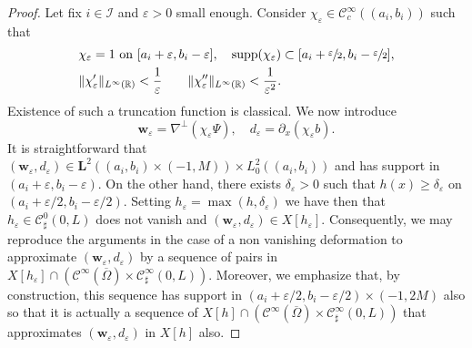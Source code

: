 \documentclass[10pt]{amsart}
\let\mathcal\mathscr
\theoremstyle{remark}
\theoremstyle{definition}
\newcommand{\wg}{\boldsymbol{w}}
\newcommand{\BS}[1]{\boldsymbol{#1}}
\begin{document}
\begin{proof}
Let fix $i \in \mathcal I$ and $\varepsilon>0$ small enough. Consider $\chi_{\varepsilon} \in \mathcal{C}^{\infty}_{c}((a_{i},b_{i}))$ such that
\[
\begin{aligned}
& \chi_{\varepsilon}=1 \text{ on $[a_{i}+\varepsilon,b_{i}-\varepsilon]$},
\quad
\text{supp}(\chi_{\varepsilon})\subset[a_{i}+\sfrac{\varepsilon}{2},b_{i}-\sfrac{\varepsilon}{2}], \\
& \|\chi_{\varepsilon}'\|_{L^{\infty}(\mathbb R)}<\frac{1}{\varepsilon}
\qquad \|\chi_{\varepsilon}''\|_{L^{\infty}(\mathbb R)}<\frac{1}{\varepsilon^{2}}.
\end{aligned}
\]
Existence of such a truncation function is classical.
We now introduce
\[
\wg_\varepsilon=\nabla^{\perp}(\chi_{\varepsilon}\Psi), \quad
d_{\varepsilon} = \partial_x (\chi_{\varepsilon}b).
\]
It is straightforward that $(\wg_{\varepsilon},d_{\varepsilon}) \in \BS L^2((a_{i},b_{i}) \times (-1,M)) \times L^2_0((a_{i},b_{i}))$ and has support in $(a_i+\varepsilon,b_i-\varepsilon)$. On the other hand, there exists $\delta_{\varepsilon}>0$ such that $h(x)\geq \delta_{\varepsilon}$
on $(a_i+\varepsilon/2,b_i-\varepsilon/2)$. Setting $h_{\varepsilon} = \max(h,\delta_{\varepsilon})$ we have then that $h_{\varepsilon} \in \mathcal C^0_{\sharp}(0,L)$ does not vanish and $(\wg_{\varepsilon},d_{\varepsilon}) \in X[h_{\varepsilon}]$. Consequently, we may reproduce the arguments in the case of a non vanishing deformation to approximate $(\wg_{\varepsilon},d_{\varepsilon})$ by a sequence of pairs
in $X[h_{\varepsilon}] \cap (\mathcal C^{\infty}(\overline{\Omega}) \times \mathcal C^{\infty}_{\sharp}(0,L))$. Moreover, we emphasize that,
by construction, this sequence has support in $(a_i+\varepsilon/2,b_i-\varepsilon/2)\times (-1,2M)$ also so that it is actually a sequence of $X[h] \cap (\mathcal C^{\infty}(\overline{\Omega}) \times \mathcal C^{\infty}_{\sharp}(0,L))$ that approximates $(\wg_{\varepsilon},d_{\varepsilon})$ in $X[h]$ also.


\end{proof}
\end{document}
